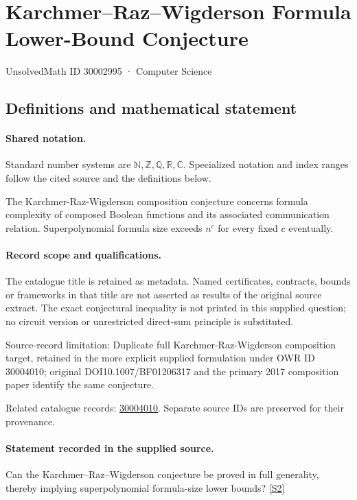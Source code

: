 \documentclass[11pt]{article}
\newcommand{\sref}[2]{\hyperlink{source:#1:#2}{[S#2]}}
\begin{document}
\setcounter{section}{30002994}
\section{Karchmer–Raz–Wigderson Formula Lower-Bound Conjecture}\label{30002995}
{\small\sffamily UnsolvedMath ID 30002995 · Computer Science}
\subsection{Definitions and mathematical statement}

\paragraph{Shared notation.}Standard number systems are $\mathbb N,\mathbb Z,\mathbb Q,\mathbb R,\mathbb C$. Specialized notation and index ranges follow the cited source and the definitions below.


The Karchmer-Raz-Wigderson composition conjecture concerns formula complexity of composed Boolean functions and its associated communication relation. Superpolynomial formula size exceeds $n^c$ for every fixed $c$ eventually.
\paragraph{Record scope and qualifications.}
The catalogue title is retained as metadata. Named certificates, contracts, bounds or frameworks in that title are not asserted as results of the original source extract.
The exact conjectural inequality is not printed in this supplied question; no circuit version or unrestricted direct-sum principle is substituted.

Source-record limitation: Duplicate full Karchmer-Raz-Wigderson composition target, retained in the more explicit supplied formulation under OWR ID 30004010; original DOI10.1007/BF01206317 and the primary 2017 composition paper identify the same conjecture.

Related catalogue records: \href{https://mehmetmars7.github.io/Erdosproblems-llm-hunter/problem.html?type=open_problems&id=30004010}{30004010}. Separate source IDs are preserved for their provenance.
\paragraph{Statement recorded in the supplied source.}
Can the Karchmer–Raz–Wigderson conjecture be proved in full generality, thereby implying superpolynomial formula-size lower bounds? \sref{30002995}{2}
\end{document}
